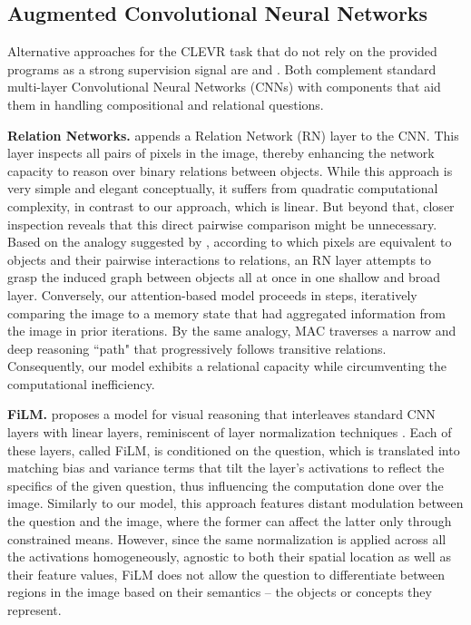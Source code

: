 \documentclass[fleqn]{article}
\begin{document}
\subsection{Augmented Convolutional Neural Networks}
Alternative approaches for the CLEVR task that do not rely on the provided programs as a strong supervision signal are \citet{rn} and \citet{film}. Both complement standard multi-layer Convolutional Neural Networks (CNNs) with components that aid them in handling compositional and relational questions.

\textbf{Relation Networks.} \citet{rn} appends a Relation Network (RN) layer to the CNN. This layer inspects all pairs of pixels in the image, thereby enhancing the network capacity to reason over binary relations between objects. While this approach is very simple and elegant conceptually, it suffers from quadratic computational complexity, in contrast to our approach, which is linear. But beyond that, closer inspection reveals that this direct pairwise comparison might be unnecessary. Based on the analogy suggested by \citet{rn}, according to which pixels are equivalent to objects and their pairwise interactions to relations, an RN layer attempts to grasp the induced graph between objects all at once in one shallow and broad layer. Conversely, our attention-based model proceeds in steps, iteratively comparing the image to a memory state that had aggregated information from the image in prior iterations. By the same analogy, MAC traverses a narrow and deep reasoning ``path" that progressively follows transitive relations. Consequently, our model exhibits a relational capacity while circumventing the computational inefficiency.

\textbf{FiLM.} \citet{film} proposes a model for visual reasoning that interleaves standard CNN layers with linear layers, reminiscent of layer normalization techniques \citep{ln,bn}. Each of these layers, called FiLM, is conditioned on the question, which is translated into matching bias and variance terms that tilt the layer's activations to reflect the specifics of the given question, thus influencing the computation done over the image. Similarly to our model, this approach features distant modulation between the question and the image, where the former can affect the latter only through constrained means. However, since the same normalization is applied across all the activations homogeneously, agnostic to both their spatial location as well as their feature values, FiLM does not allow the question to differentiate between regions in the image based on their semantics -- the objects or concepts they represent. 
\end{document}
